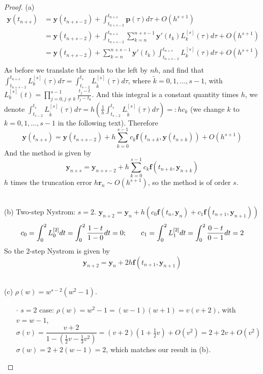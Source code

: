 \documentclass[a4paper, 10pt]{article}
\theoremstyle{definition}
\theoremstyle{hSol}
\begin{document}
\begin{proof} (a) 
\begin{equation}
  \begin{split}
    \bm{y}(t_{n+s}) &= \bm{y}(t_{n+s-2}) + \int_{t_{n+s-2}}^{t_{n+s}} \bm{p}(\tau) d\tau + O(h^{s+1}) \\
    &=\bm{y}(t_{n+s-2}) + \int_{t_{n+s-2}}^{t_{n+s}} \sum_{k=n}^{n+s-1} \bm{y}'(t_k)L_k^{[s]}(\tau) d\tau + O(h^{s+1}) \\
    &=\bm{y}(t_{n+s-2}) + \sum_{k=n}^{n+s-1} \bm{y}'(t_k)\int_{t_{n+s-2}}^{t_{n+s}} L_k^{[s]}(\tau) d\tau + O(h^{s+1}) \\
  \end{split}
\end{equation}
As before we translate the mesh to the left by $nh$, and find that $\int_{t_{n+s-2}}^{t_{n+s}} L_k^{[s]}(\tau) d\tau = \int_{t_{s-2}}^{t_{s}} L^{[s]}_{\tilde{k}}(\tau) d\tau$, where $\tilde{k}=0,1,...,s-1$, with $L_{k}^{[s]}(t)=\prod_{j=0, j\ne k}^{s-1} \frac{t_j - t}{t_j - t_k}$. And this integral is a constant quantity times $h$, we denote $\int_{t_{s-2}}^{t_{s}} L_{\tilde{k}}^{[s]}(\tau) d\tau = h\left(\frac{1}{h}\int_{t_{s-2}}^{t_{s}} L_{\tilde{k}}^{[s]}(\tau) d\tau\right)=:hc_k$ (we change $k$ to $k=0,1,...,s-1$ in the following text). Therefore
\begin{equation}
  \bm{y}(t_{n+s}) = \bm{y}(t_{n+s-2}) + h\sum_{k=0}^{s-1} c_{k}\bm{f}(t_{n+k}, \bm{y}(t_{n+k})) + O(h^{s+1})
\end{equation}   
And the method is given by
\begin{equation}
  \bm{y}_{n+s} = \bm{y}_{n+s-2} + h\sum_{k=0}^{s-1} c_{k}\bm{f}(t_{n+k}, \bm{y}_{n+k})
\end{equation}
$h$ times the truncation error $h\bm{r}_n \sim O(h^{s+1})$, so the method is of order $s$.

~\\
(b) Two-step Nystrom: $s=2$. $\bm{y}_{n+2}=\bm{y}_n + h(c_0 \bm{f}(t_n, \bm{y}_n)+c_1 \bm{f}(t_{n+1}, \bm{y}_{n+1}))$
\begin{equation}
    c_0 = \int_{0}^2 L_0^{[2]} dt = \int_0^2 \frac{1-t}{1-0}dt = 0;~~~~~~c_1 = \int_{0}^2 L_1^{[2]} dt = \int_0^2 \frac{0-t}{0-1}dt = 2 \\
\end{equation}
So the 2-step Nystrom is given by
$$
\bm{y}_{n+2}=\bm{y}_n + 2h\bm{f}(t_{n+1}, \bm{y}_{n+1})
$$

~\\
(c) $\rho(w)=w^{s-2}(w^2-1)$.
\begin{itemize}
  \item[$\cdot$] $s=2$ case: $\rho(w)=w^2-1=(w-1)(w+1)=v(v+2)$, with $v=w-1$,
  $$
  \sigma(v) = \frac{v + 2}{1-(\frac{1}{2}v-\frac{1}{3}v^2)} = (v+2)(1+\tfrac{1}{2}v)+O(v^2)  = 2+2v+O(v^2)
  $$
  $\sigma(w)=2+2(w-1)=2$, which matches our result in (b).


\end{itemize}
\end{proof}
\end{document}
